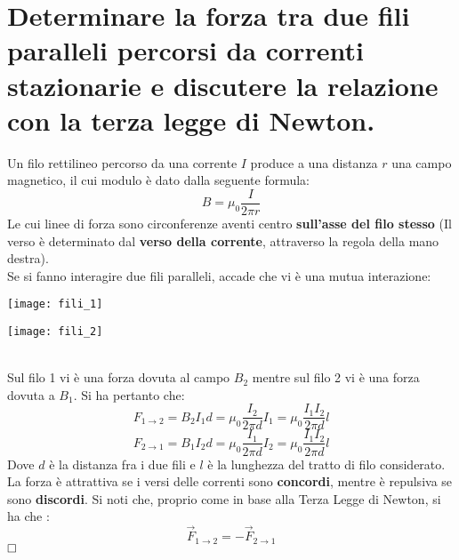 \section{Determinare la forza tra due fili paralleli percorsi da
	correnti stazionarie e discutere la relazione con la terza
	legge di Newton.}
Un filo rettilineo percorso da una corrente $I$ produce a una distanza $r$ una campo magnetico, il cui modulo \`e dato dalla seguente formula:
\begin{equation}
 	B = \mu_0 \frac{I}{2 \pi r}
\end{equation}
Le cui linee di forza sono circonferenze aventi centro \textbf{sull'asse del filo stesso} (Il verso \`e determinato dal \textbf{verso della corrente}, attraverso la regola della mano destra).\\
Se si fanno interagire due fili paralleli, accade che vi \`e una mutua interazione: 

\noindent\begin{minipage}{0.4\textwidth}
	\texttt{[image: fili\_1]}
\end{minipage}
\hfill%
\begin{minipage}{0.4\textwidth}\raggedleft
	\texttt{[image: fili\_2]}
\end{minipage}\\
 Sul filo 1 vi \`e una forza dovuta al campo $B_2$ mentre sul filo 2 vi \`e una forza dovuta a $B_1$. Si ha pertanto che:
 $$
     F_{1 \rightarrow 2} = B_2 I_1 d = \mu_0 \frac{I_2}{2 \pi d}I_1 = \mu_0 \frac{I_1 I_2}{2 \pi d}l
 $$
 $$
     F_{2 \rightarrow 1} = B_1 I_2 d = \mu_0 \frac{I_1}{2 \pi d}I_2 = \mu_0 \frac{I_1 I_2}{2 \pi d}l
 $$
 Dove $d$ \`e la distanza fra i due fili e $l$ \`e la lunghezza del tratto di filo considerato.\\
 La forza \`e attrattiva se i versi delle correnti sono \textbf{concordi}, mentre \`e repulsiva se sono \textbf{discordi}.
 Si noti che, proprio come in base alla Terza Legge di Newton, si ha che :
 $$
     \vec{F}_{1 \rightarrow 2} = -\vec{F}_{2 \rightarrow 1}
 $$
 $\hfill\square$
